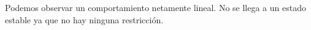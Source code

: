 \documentclass[12pt]{article}
\numberwithin{equation}{section}
\begin{document}
\begin{figure}[!ht]
\begin{floatrow}
\end{floatrow}
\FloatBarrier
\end{figure}
\FloatBarrier
Podemos observar un comportamiento netamente lineal. No se llega a un estado estable ya que no hay ninguna restricción.\\
\end{document}
